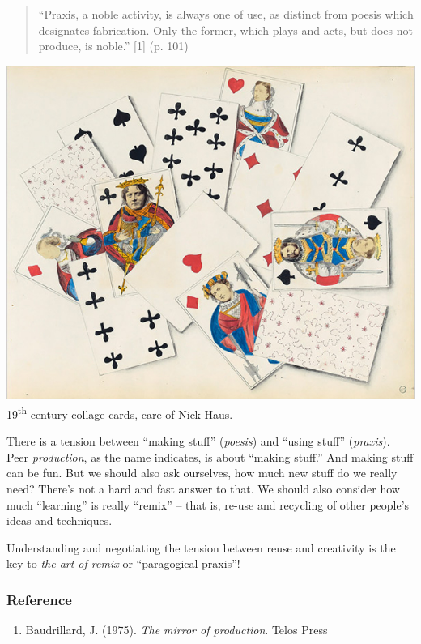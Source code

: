 \begin{quote}
``Praxis, a noble activity, is always one of use, as distinct from
poesis which designates fabrication. Only the former, which plays and
acts, but does not produce, is noble.'' {[}1{]} (p. 101)
\end{quote}

\begin{center}
\includegraphics[width=.65\textwidth]{../pictures/collage_cards.jpg}\\
19\textsuperscript{th} century collage cards, care of
\href{http://www.nickhaus.com/2010/02/afternoon-remembered-complete-with.html}{Nick Haus}.
\end{center}



There is a tension between ``making stuff'' (\emph{poesis}) and ``using
stuff'' (\emph{praxis}). Peer \emph{production}, as the name indicates,
is about ``making stuff.'' And making stuff can be fun. But we should
also ask ourselves, how much new stuff do we really need? There's not a
hard and fast answer to that. We should also consider how much
``learning'' is really ``remix'' -- that is, re-use and recycling of
other people's ideas and techniques.

Understanding and negotiating the tension between reuse and creativity
is the key to \emph{the art of remix} or ``paragogical praxis''!

\subsubsection{Reference}

\begin{enumerate}
\item
  Baudrillard, J. (1975). \emph{The mirror of production}. Telos Press
\end{enumerate}
